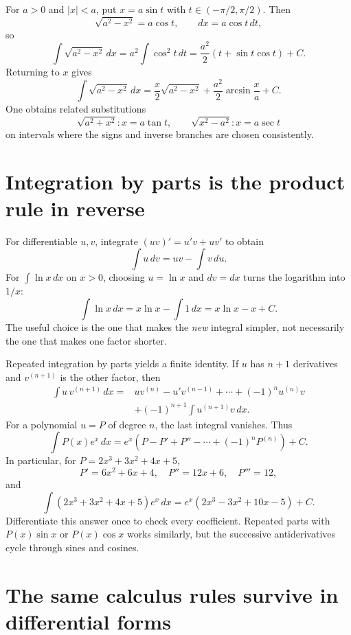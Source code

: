 \begin{example}
For \(a>0\) and \(|x|<a\), put \(x=a\sin t\) with
\(t\in(-\pi/2,\pi/2)\). Then
\[
 \sqrt{a^2-x^2}=a\cos t,\qquad dx=a\cos t\,dt,
\]
so
\[
 \int\sqrt{a^2-x^2}\,dx
 =a^2\int\cos^2t\,dt
 =\frac{a^2}{2}\left(t+\sin t\cos t\right)+C.
\]
Returning to \(x\) gives
\[
 \boxed{\int\sqrt{a^2-x^2}\,dx
  =\frac x2\sqrt{a^2-x^2}+\frac{a^2}{2}\arcsin\frac xa+C.}
\]
One obtains related substitutions
\[
 \sqrt{a^2+x^2}: x=a\tan t,\qquad
 \sqrt{x^2-a^2}: x=a\sec t
\]
on intervals where the signs and inverse branches are chosen consistently.
\end{example}

\section{Integration by parts is the product rule in reverse}

For differentiable \(u,v\), integrate \((uv)'=u'v+uv'\) to obtain
\[
 \boxed{\int u\,dv=uv-\int v\,du.}
\]
For \(\int\ln x\,dx\) on \(x>0\), choosing \(u=\ln x\) and \(dv=dx\) turns the logarithm into \(1/x\):
\[
 \int\ln x\,dx=x\ln x-\int1\,dx=x\ln x-x+C.
\]
The useful choice is the one that makes the \emph{new} integral simpler, not necessarily the one that makes one factor shorter.

Repeated integration by parts yields a finite identity. If \(u\) has \(n+1\) derivatives and \(v^{(n+1)}\) is the other factor, then
\[
\begin{aligned}
 \int u\,v^{(n+1)}\,dx
 ={}& u v^{(n)}-u'v^{(n-1)}+\cdots+(-1)^n u^{(n)}v\\
    &+(-1)^{n+1}\int u^{(n+1)}v\,dx.
\end{aligned}
\]
For a polynomial \(u=P\) of degree \(n\), the last integral vanishes. Thus
\[
 \int P(x)e^x\,dx=e^x(P-P'+P''-\cdots+(-1)^nP^{(n)})+C.
\]
In particular, for \(P=2x^3+3x^2+4x+5\),
\[
 P'=6x^2+6x+4,\quad P''=12x+6,\quad P'''=12,
\]
and
\[
 \boxed{\int(2x^3+3x^2+4x+5)e^x\,dx
       =e^x(2x^3-3x^2+10x-5)+C.}
\]
Differentiate this answer once to check every coefficient. Repeated parts with \(P(x)\sin x\) or \(P(x)\cos x\) works similarly, but the successive antiderivatives cycle through sines and cosines.

\section{The same calculus rules survive in differential forms}

